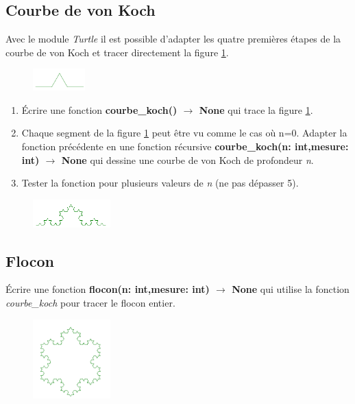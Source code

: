 \documentclass[a4paper,11pt]{article}
\begin{document}
\begin{Form}
\subsection{Courbe de von Koch}
Avec le module \emph{Turtle} il est possible d'adapter les quatre premières étapes de la courbe de von Koch et tracer directement la figure \ref{koch1}.
\begin{figure}[!h]
\centering
\includegraphics[width=2cm]{ressources/koch1.png}
\label{koch1}
\end{figure}
\begin{activite}
\begin{enumerate}
\item Écrire une fonction \textbf{courbe\_koch() $\rightarrow$ None} qui trace la figure \ref{koch1}.
\item Chaque segment de la figure \ref{koch1} peut être vu comme le cas où n=0. Adapter la fonction précédente en une fonction récursive \textbf{courbe\_koch(n: int,mesure: int) $\rightarrow$ None} qui dessine une courbe de von Koch de profondeur \emph{n}.
\item Tester la fonction pour plusieurs valeurs de \emph{n}  (ne pas dépasser 5).
\end{enumerate}
\end{activite}
\begin{figure}[!h]
\centering
\includegraphics[width=3cm]{ressources/koch3.png}
\label{koch3}
\end{figure}
\subsection{Flocon}
\begin{activite}
Écrire une fonction \textbf{flocon(n: int,mesure: int) $\rightarrow$ None} qui utilise la fonction \emph{courbe\_koch} pour tracer le flocon entier.
\end{activite}
\begin{figure}[!h]
\centering
\includegraphics[width=3cm]{ressources/flocon.png}
\label{flocon}
\end{figure}

\end{Form}
\end{document}
